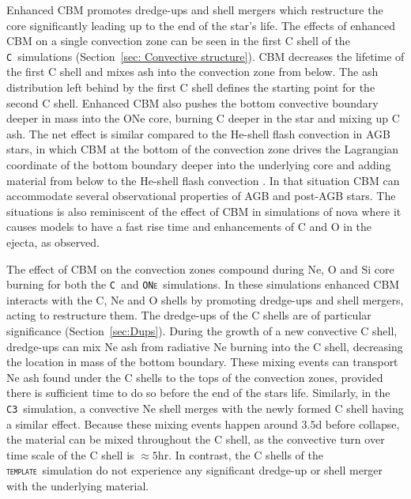\documentclass[useAMS,usenatbib]{mn2e}
\newcommand{\template}{\textsc{\texttt{template}}}
\newcommand{\Cc}{\textsc{\texttt{C3}}}
\newcommand{\C}{\textsc{\texttt{C}}}
\newcommand{\ONe}{\textsc{\texttt{ONe}}}
\begin{document}
Enhanced CBM promotes dredge-ups and shell mergers which restructure 
the core significantly leading up to the end of the star's life. The effects of 
enhanced CBM on a single convection zone can be seen in the first C shell 
of the \C\ simulations (Section~\ref{sec: Convective structure}). CBM 
decreases the lifetime of the first C shell and mixes ash into the convection 
zone from below. The ash distribution left behind by the first C shell defines 
the starting point for the second C shell. Enhanced CBM also pushes the 
bottom convective boundary deeper in mass into the ONe core, burning C 
deeper in the star and mixing up C ash. The net effect is similar compared to the He-shell flash convection in AGB stars, in which CBM at the bottom of the convection zone drives the Lagrangian coordinate of the bottom boundary deeper into the underlying core and adding material from below to the He-shell flash convection \citep{Herwig2000}. In that situation CBM can accommodate several observational properties of AGB \citep{Herwig2005} and post-AGB \citep{Werner06} stars.  The situations is also reminiscent of the effect of CBM in simulations of nova \citep{Denissenkov2012} where it causes models to have a fast rise time and enhancements of C and O in the ejecta, as observed.

The effect of CBM on the convection 
zones compound during Ne, O and Si core burning for both the \C\ and 
\ONe\ simulations. In these simulations enhanced CBM interacts with the 
C, Ne and O shells by promoting dredge-ups and shell mergers, acting to 
restructure them. The dredge-ups of the C shells are of particular significance 
(Section~\ref{sec:Dups}).  During the growth of a new convective C shell, 
dredge-ups can mix Ne ash from radiative Ne burning into the C shell, 
decreasing the location in mass of the bottom boundary. These mixing 
events can transport Ne ash found under the C shells to the tops of the 
convection zones, provided there is sufficient time to do so before the end 
of the stars life. Similarly, in the \Cc\ simulation, a convective Ne shell 
merges with the newly formed C shell having a similar effect. Because 
these mixing events happen around $3.5 \mathrm{d}$ before collapse, 
the material can be mixed throughout the C shell, as the convective turn over 
time scale of the C shell is $\approx 5 \mathrm{hr}$. In contrast, the C shells 
of the \template\ simulation do not experience any significant dredge-up or 
shell merger with the underlying material. 

\end{document}
